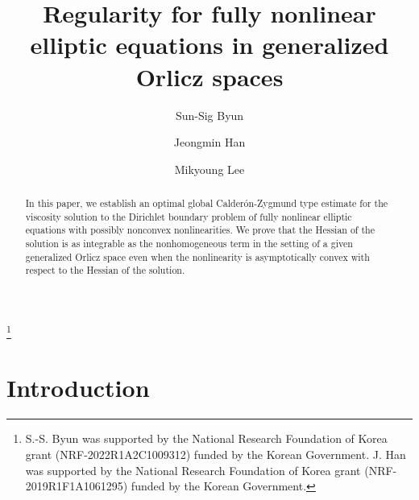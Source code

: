 \documentclass[11pt, reqno]{amsart}
\newcommand\blfootnote[1]{%
  \begingroup
  \renewcommand\thefootnote{}\footnote{#1}%
  \addtocounter{footnote}{-1}%
  \endgroup
}
\numberwithin{equation}{section}
\begin{document}
\title[]{Regularity for fully nonlinear elliptic equations in generalized Orlicz spaces}


\author[Byun]{Sun-Sig Byun}
\address{Department of Mathematical Sciences, Seoul National University,
Seoul 08826, Republic of Korea}

\author[Han]{Jeongmin Han}
\address{Department of Mathematics, Soongsil University,
Seoul 06978, Republic of Korea}

\author[Lee]{Mikyoung Lee}
\address{Department of Mathematics and Institute of Mathematical Science, Pusan National University,
Busan 46241, Republic of Korea}


\blfootnote{S.-S. Byun was supported by the National Research Foundation of Korea grant (NRF-2022R1A2C1009312) funded by the Korean Government. J. Han was supported by the National Research Foundation of Korea grant (NRF-2019R1F1A1061295) funded by the Korean Government.}


\begin{abstract}
In this paper, we establish an optimal global Calder\'{o}n-Zygmund type estimate for the viscosity
solution to the Dirichlet boundary problem of fully nonlinear elliptic equations with possibly nonconvex nonlinearities. 
We prove that the Hessian of the solution is as integrable as the nonhomogeneous term in the
setting of a given generalized Orlicz space even when the
nonlinearity is asymptotically convex with respect to the Hessian of
the solution.
\end{abstract}


\maketitle



\section{Introduction}
\end{document}
